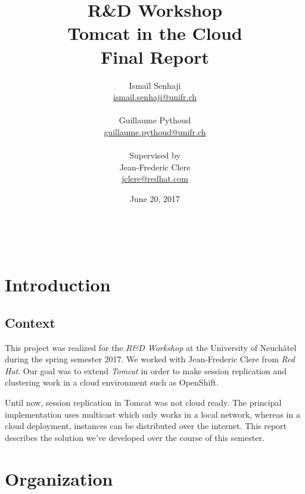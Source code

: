 \documentclass[11pt,a4paper]{article}
\title{%
    \textbf{R\&D Workshop} \\
    Tomcat in the Cloud
    \\
    \textbf{Final Report}
}
\author{%
    Ismaïl Senhaji \\
    \small \href{mailto:ismail.senhaji@unifr.ch}{ismail.senhaji@unifr.ch} \\
    \\
    Guillaume Pythoud \\
    \small \href{mailto:guillaume.pythoud@unifr.ch}{guillaume.pythoud@unifr.ch}
    \\
    \\
    Supervised by \\
    Jean-Frederic Clere \\
    \small \href{mailto:jclere@redhat.com}{jclere@redhat.com}
}
\date{June 20, 2017}
\begin{document}
\graphicspath{{fig/}}

\maketitle

\begin{figure}[b]
    \centering
    \\
\end{figure}

\newpage
\tableofcontents

\newpage



\section{Introduction}
\subsection{Context}
This project was realized for the \emph{R\&D Workshop} at the University of Neuchâtel during the spring semester 2017. We worked with Jean-Frederic Clere from \emph{Red Hat}\autocite{redhat}. Our goal was to extend \emph{Tomcat}\autocite{tomcat} in order to make session replication and clustering work in a cloud environment such as OpenShift\autocite{openshift}.

Until now, session replication in Tomcat was not cloud ready. The principal implementation uses multicast which only works in a local network, whereas in a cloud deployment, instances can be distributed over the internet. This report describes the solution we've developed over the course of this semester.


\section{Organization}
\end{document}
